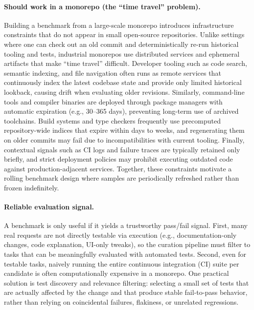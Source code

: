 \paragraph{Should work in a monorepo (the ``time travel'' problem).}
Building a benchmark from a large-scale monorepo introduces infrastructure constraints that do not appear in small open-source repositories.
Unlike settings where one can check out an old commit and deterministically re-run historical tooling and tests, industrial monorepos use distributed services and ephemeral artifacts that make ``time travel'' difficult.
Developer tooling such as code search, semantic indexing, and file navigation often runs as remote services that continuously index the latest codebase state and provide only limited historical lookback, causing drift when evaluating older revisions.
Similarly, command-line tools and compiler binaries are deployed through package managers with automatic expiration (e.g., 30--365 days), preventing long-term use of archived toolchains.
Build systems and type checkers frequently use precomputed repository-wide indices that expire within days to weeks, and regenerating them on older commits may fail due to incompatibilities with current tooling.
Finally, contextual signals such as CI logs and failure traces are typically retained only briefly, and strict deployment policies may prohibit executing outdated code against production-adjacent services.
Together, these constraints motivate a rolling benchmark design where samples are periodically refreshed rather than frozen indefinitely.

\paragraph{Reliable evaluation signal.}
A benchmark is only useful if it yields a trustworthy pass/fail signal.
First, many real requests are not directly testable via execution (e.g., documentation-only changes, code explanation, UI-only tweaks), so the curation pipeline must filter to tasks that can be meaningfully evaluated with automated tests.
Second, even for testable tasks, naively running the entire continuous integration (CI) suite per candidate is often computationally expensive in a monorepo.
One practical solution is test discovery and relevance filtering: selecting a small set of tests that are actually affected by the change and that produce stable fail-to-pass behavior, rather than relying on coincidental failures, flakiness, or unrelated regressions.




